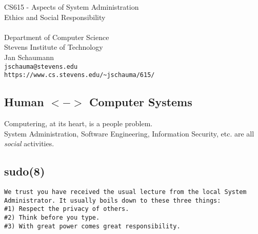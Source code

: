 \documentclass[xga]{xdvislides}
\begin{document}
\setfontphv

\lhead{\slidetitle}                               %
\cfoot{\relax}                               %
\rfoot{\Gray{\today}}

\vspace*{\fill}
\begin{center}
	\Hugesize
		CS615 - Aspects of System Administration\\ [1em]
		Ethics and Social Responsibility\\ [1em]
	\hspace*{5mm}\blueline\\ [1em]
	\Normalsize
		Department of Computer Science\\
		Stevens Institute of Technology\\
		Jan Schaumann\\
		\verb+jschauma@stevens.edu+\\
		\verb+https://www.cs.stevens.edu/~jschauma/615/+
\end{center}
\vspace*{\fill}

\subsection{Human $<->$ Computer Systems}
\vspace*{\fill}
\Huge
\begin{center}
Computering, at its heart, is a people problem. \\
\vspace{.5in}
System Administration, Software Engineering,
Information Security, etc. are all {\em social}
activities.
\end{center}
\Normalsize
\vspace*{\fill}

\subsection{sudo(8)}
\vspace*{\fill}
\begin{verbatim}
We trust you have received the usual lecture from the local System
Administrator. It usually boils down to these three things:
#1) Respect the privacy of others.
#2) Think before you type.
#3) With great power comes great responsibility.
\end{verbatim}
\vspace*{\fill}
\end{document}
